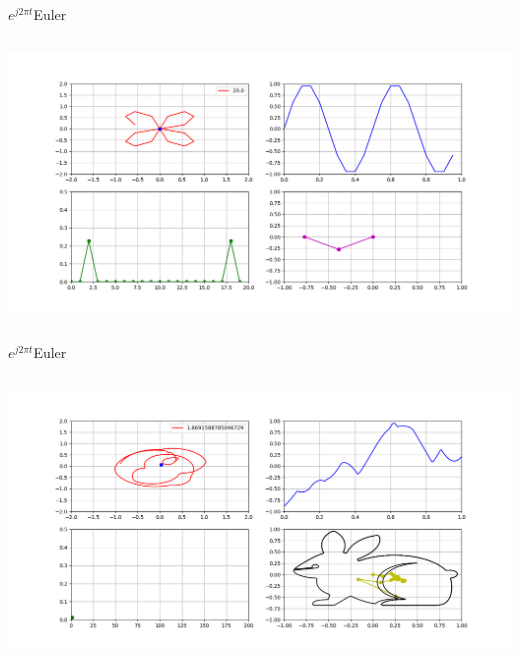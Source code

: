 \begin{frame}{$e^{j2\pi t}$}{Euler}
   \handsonicon
   \begin{columns}[onlytextwidth]
      
      
      \centering\includegraphics[width=1.0\textwidth]{2_clase/euler5}
   \end{columns}
   \vfill
\end{frame}

\begin{frame}{$e^{j2\pi t}$}{Euler}
   \handsonicon
   \begin{columns}[onlytextwidth]
      
      
      \centering\includegraphics[width=1.0\textwidth]{2_clase/euler6}
   \end{columns}
   \vfill
\end{frame}

